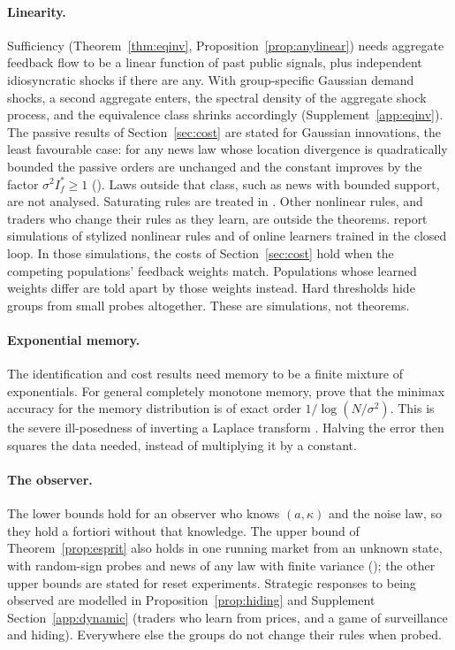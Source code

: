 \documentclass[12pt]{article}
\theoremstyle{definition}
\theoremstyle{remark}
\begin{document}
\paragraph{Linearity.} Sufficiency (Theorem~\ref{thm:eqinv}, Proposition~\ref{prop:anylinear}) needs aggregate feedback flow to be a linear function of past public signals, plus independent idiosyncratic shocks if there are any. With group-specific Gaussian demand shocks, a second aggregate enters, the spectral density of the aggregate shock process, and the equivalence class shrinks accordingly (Supplement~\ref{app:eqinv}). The passive results of Section~\ref{sec:cost} are stated for Gaussian innovations, the least favourable case: for any news law whose location divergence is quadratically bounded the passive orders are unchanged and the constant improves by the factor $\sigma^2I^*_f\ge1$ (\citealp[Proposition~S16.2]{niroula2026full}). Laws outside that class, such as news with bounded support, are not analysed. Saturating rules are treated in \citet[Section~S6]{niroula2026full}. Other nonlinear rules, and traders who change their rules as they learn, are outside the theorems. \citet{niroula2026a} report simulations of stylized nonlinear rules and of online learners trained in the closed loop. In those simulations, the costs of Section~\ref{sec:cost} hold when the competing populations' feedback weights match. Populations whose learned weights differ are told apart by those weights instead. Hard thresholds hide groups from small probes altogether. These are simulations, not theorems.

\paragraph{Exponential memory.} The identification and cost results need memory to be a finite mixture of exponentials. For general completely monotone memory, \citet{niroula2026a} prove that the minimax accuracy for the memory distribution is of exact order $1/\log(N/\sigma^2)$. This is the severe ill-posedness of inverting a Laplace transform \citep{epstein2008}. Halving the error then squares the data needed, instead of multiplying it by a constant.

\paragraph{The observer.} The lower bounds hold for an observer who knows $(a,\kappa)$ and the noise law, so they hold a fortiori without that knowledge. The upper bound of Theorem~\ref{prop:esprit} also holds in one running market from an unknown state, with random-sign probes and news of any law with finite variance (\citealp[Theorem~S16.1]{niroula2026full}); the other upper bounds are stated for reset experiments. Strategic responses to being observed are modelled in Proposition~\ref{prop:hiding} and Supplement Section~\ref{app:dynamic} (traders who learn from prices, and a game of surveillance and hiding). Everywhere else the groups do not change their rules when probed.
\end{document}
